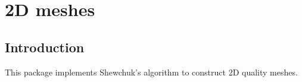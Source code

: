 \chapter{2D meshes}

\minitoc

\section{Introduction}

This package implements Shewchuk's algorithm to construct 2D quality meshes.


